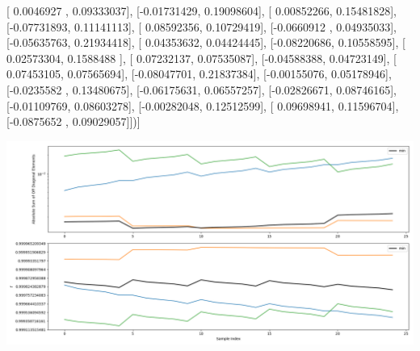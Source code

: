 \documentclass{article}
\begin{document}
       [ 0.0046927 ,  0.09333037],
       [-0.01731429,  0.19098604],
       [ 0.00852266,  0.15481828],
       [-0.07731893,  0.11141113],
       [ 0.08592356,  0.10729419],
       [-0.0660912 ,  0.04935033],
       [-0.05635763,  0.21934418],
       [ 0.04353632,  0.04424445],
       [-0.08220686,  0.10558595],
       [ 0.02573304,  0.1588488 ],
       [ 0.07232137,  0.07535087],
       [-0.04588388,  0.04723149],
       [ 0.07453105,  0.07565694],
       [-0.08047701,  0.21837384],
       [-0.00155076,  0.05178946],
       [-0.0235582 ,  0.13480675],
       [-0.06175631,  0.06557257],
       [-0.02826671,  0.08746165],
       [-0.01109769,  0.08603278],
       [-0.00282048,  0.12512599],
       [ 0.09698941,  0.11596704],
       [-0.0875652 ,  0.09029057]])]
\begin{center}
\includegraphics[scale=.9]{report_pickled_controls204/control_dpn_all.png}

\end{center}
\end{document}
